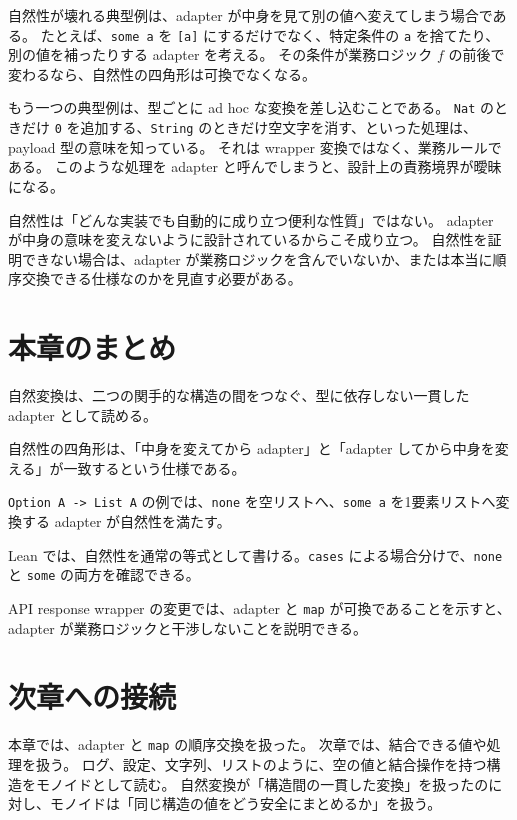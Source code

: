 自然性が壊れる典型例は、adapter が中身を見て別の値へ変えてしまう場合である。
たとえば、\texttt{some a} を \texttt{[a]} にするだけでなく、特定条件の \texttt{a} を捨てたり、別の値を補ったりする adapter を考える。
その条件が業務ロジック \(f\) の前後で変わるなら、自然性の四角形は可換でなくなる。

もう一つの典型例は、型ごとに ad hoc な変換を差し込むことである。
\texttt{Nat} のときだけ \texttt{0} を追加する、\texttt{String} のときだけ空文字を消す、といった処理は、payload 型の意味を知っている。
それは wrapper 変換ではなく、業務ルールである。
このような処理を adapter と呼んでしまうと、設計上の責務境界が曖昧になる。

\begin{warningbox}
自然性は「どんな実装でも自動的に成り立つ便利な性質」ではない。
adapter が中身の意味を変えないように設計されているからこそ成り立つ。
自然性を証明できない場合は、adapter が業務ロジックを含んでいないか、または本当に順序交換できる仕様なのかを見直す必要がある。
\end{warningbox}

\section{本章のまとめ}

自然変換は、二つの関手的な構造の間をつなぐ、型に依存しない一貫した adapter として読める。

自然性の四角形は、「中身を変えてから adapter」と「adapter してから中身を変える」が一致するという仕様である。

\texttt{Option A -> List A} の例では、\texttt{none} を空リストへ、\texttt{some a} を1要素リストへ変換する adapter が自然性を満たす。

Lean では、自然性を通常の等式として書ける。\texttt{cases} による場合分けで、\texttt{none} と \texttt{some} の両方を確認できる。

API response wrapper の変更では、adapter と \texttt{map} が可換であることを示すと、adapter が業務ロジックと干渉しないことを説明できる。

\section{次章への接続}

本章では、adapter と \texttt{map} の順序交換を扱った。
次章では、結合できる値や処理を扱う。
ログ、設定、文字列、リストのように、空の値と結合操作を持つ構造をモノイドとして読む。
自然変換が「構造間の一貫した変換」を扱ったのに対し、モノイドは「同じ構造の値をどう安全にまとめるか」を扱う。
